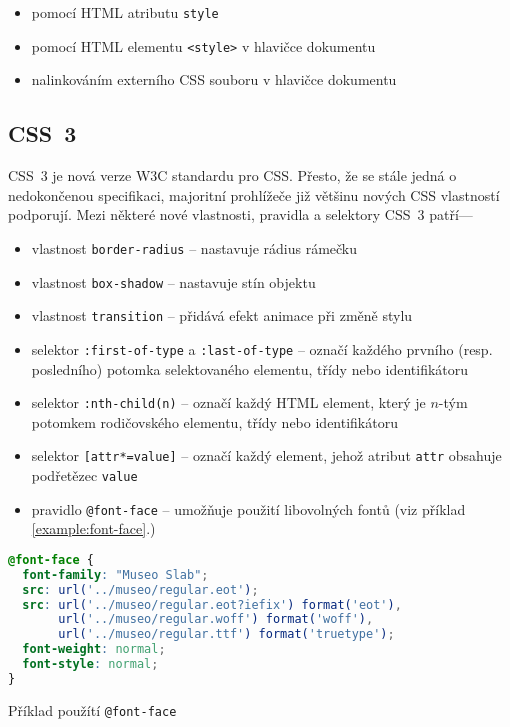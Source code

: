 \begin{itemize}
    \item pomocí HTML atributu \texttt{style}
    \item pomocí HTML elementu \texttt{<style>} v hlavičce dokumentu
    \item nalinkováním externího CSS souboru v hlavičce dokumentu
\end{itemize}

\subsection{CSS~3}

CSS~3 je nová verze W3C standardu pro CSS. Přesto, že se stále jedná o nedokončenou specifikaci, majoritní prohlížeče již většinu nových CSS vlastností podporují. Mezi některé nové vlastnosti, pravidla a selektory CSS~3 patří---

\begin{itemize}
    \item vlastnost \texttt{border-radius} -- nastavuje rádius rámečku
    \item vlastnost \texttt{box-shadow} -- nastavuje stín objektu
    \item vlastnost \texttt{transition} -- přidává efekt animace při změně stylu
    \item selektor \texttt{:first-of-type} a \texttt{:last-of-type} -- označí každého prvního (resp. posledního) potomka selektovaného elementu, třídy nebo identifikátoru
    \item selektor \texttt{:nth-child(n)} -- označí každý HTML element, který je $n$-tým potomkem rodičovského elementu, třídy nebo identifikátoru
    \item selektor \texttt{[attr*=value]} -- označí každý element, jehož atribut \texttt{attr} obsahuje podřetězec \texttt{value}
    \item pravidlo \texttt{@font-face} -- umožňuje použití libovolných fontů (viz příklad \ref{example:font-face}.)
\end{itemize}

\begin{example}
    \centering
    \begin{lstlisting}[language=css]
@font-face {
  font-family: "Museo Slab";
  src: url('../museo/regular.eot');
  src: url('../museo/regular.eot?iefix') format('eot'),
       url('../museo/regular.woff') format('woff'),
       url('../museo/regular.ttf') format('truetype');
  font-weight: normal;
  font-style: normal;
}
    \end{lstlisting}
    \caption{Příklad použítí \texttt{@font-face}}
    \label{example:font-face}
\end{example}

